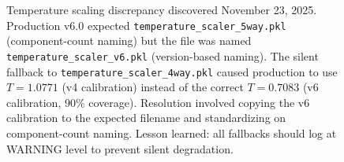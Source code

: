 \begin{figure}[htbp]
\begin{tikzpicture}
\end{tikzpicture}
\caption[Temperature Scaling Discrepancy Resolution]{Temperature scaling discrepancy discovered November 23, 2025. Production v6.0 expected \texttt{temperature\_scaler\_5way.pkl} (component-count naming) but the file was named \texttt{temperature\_scaler\_v6.pkl} (version-based naming). The silent fallback to \texttt{temperature\_scaler\_4way.pkl} caused production to use $T=1.0771$ (v4 calibration) instead of the correct $T=0.7083$ (v6 calibration, 90\% coverage). Resolution involved copying the v6 calibration to the expected filename and standardizing on component-count naming. Lesson learned: all fallbacks should log at WARNING level to prevent silent degradation.}
\label{fig:temperature-discrepancy}
\end{figure}
